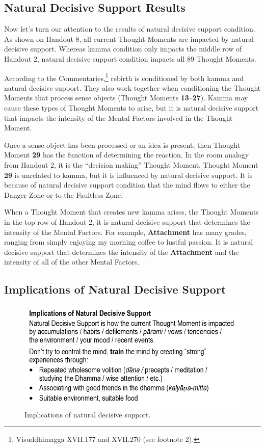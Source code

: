\subsection*{Natural Decisive Support Results}

Now let’s turn our attention to the results of natural decisive support condition. As shown on Handout 8, all current Thought Moments are impacted by natural decisive support. Whereas kamma condition only impacts the middle row of Handout 2, natural decisive support condition impacts all 89 Thought Moments.

According to the Commentaries,\footnote{Visuddhimagga XVII.177 and XVII.270 (see footnote 2).} rebirth is conditioned by both kamma and natural decisive support. They also work together when conditioning the Thought Moments that process sense objects (Thought Moments \textbf{13}--\textbf{27}). Kamma may cause these types of Thought Moments to arise, but it is natural decisive support that impacts the intensity of the Mental Factors involved in the Thought Moment.

Once a sense object has been processed or an idea is present, then Thought Moment \textbf{29} has the function of determining the reaction. In the room analogy from Handout 2, it is the “decision making” Thought Moment. Thought Moment \textbf{29} is unrelated to kamma, but it is influenced by natural decisive support. It is because of natural decisive support condition that the mind flows to either the Danger Zone or to the Faultless Zone.

When a Thought Moment that creates new kamma arises, the Thought Moments in the top row of Handout 2, it is natural decisive support that determines the intensity of the Mental Factors. For example, \textbf{Attachment} has many grades, ranging from simply enjoying my morning coffee to lustful passion. It is natural decisive support that determines the intensity of the \textbf{Attachment} and the intensity of all of the other Mental Factors.

\subsection*{Implications of Natural Decisive Support}

\begin{figure}[h]
\centering
\includegraphics[width=0.7\linewidth]{./Diagrams/Implications}
\caption{Implications of natural decisive support.}
\label{fig:Implications}
\end{figure}

